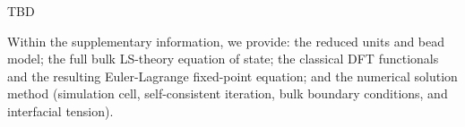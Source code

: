 \documentclass[journal=amlccd,manuscript=article,layout=twocolumn]{achemso}
\begin{document}
\begin{acknowledgement}
TBD
\end{acknowledgement}

\begin{suppinfo}
Within the supplementary information, we provide: the reduced units and bead model; the full bulk LS-theory equation of state; the classical DFT functionals  and the resulting Euler-Lagrange fixed-point equation; and the numerical solution method (simulation cell, self-consistent iteration, bulk boundary conditions, and interfacial tension).
\end{suppinfo}


\end{document}
